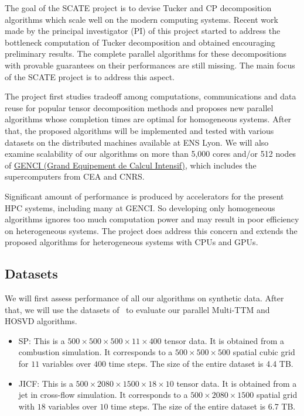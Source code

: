 \documentclass[a4paper,11pt]{article}
\newcommand{\sk}[1]{{\color{blue} \emph{#1}}}
\begin{document}
	The goal of the SCATE project is to devise Tucker and CP decomposition algorithms which scale well on the modern computing systems. Recent work~\cite{ABGKR-SIMAX-2024} made by the principal investigator (PI) of this project started to address the bottleneck computation of Tucker decomposition and obtained encouraging preliminary results. The complete parallel algorithms for these decompositions with provable guarantees on their performances are still missing. The main focus of the SCATE project is to address this aspect.
	
	The project first studies tradeoff among computations, communications and data reuse for popular tensor decomposition methods and proposes new parallel algorithms whose completion times are optimal for homogeneous systems. After that, the proposed algorithms will be implemented and tested with various datasets on the distributed machines available at ENS Lyon. We will also examine scalability of our algorithms on more than 5,000 cores and/or 512 nodes of \href{https://www.genci.fr/en/our-computers}{GENCI (Grand Equipement de Calcul Intensif)}, which includes the supercomputers from CEA and CNRS.

	
	
	Significant amount of performance is produced by accelerators for the present HPC systems, including many at GENCI. So developing only homogeneous algorithms ignores too much computation power and may result in poor efficiency on heterogeneous systems. The project does address this concern and extends the proposed algorithms for heterogeneous systems with CPUs and GPUs.
	
	

	

	\subsection{Datasets}
	\label{sec:context:datasets}
	We will first assess performance of all our algorithms on synthetic data. After that, we will use the datasets of~\cite{BKK-TOMS-2020} to evaluate our parallel Multi-TTM and HOSVD algorithms.
	\begin{itemize}
		\item SP: This is a $500 \times 500 \times 500 \times 11 \times 400$ tensor data. It is obtained from a combustion simulation. It corresponds to a $500 \times 500 \times 500$ spatial cubic grid for $11$ variables over $400$ time steps. The size of the entire dataset is 4.4 TB. 
		\item JICF: This is a $500 \times 2080 \times 1500 \times 18 \times 10$ tensor data. It is obtained from a jet in cross-flow simulation. It corresponds to a $500 \times 2080 \times 1500$ spatial grid with $18$ variables over $10$ time steps. The size of the entire dataset is 6.7 TB.
	\end{itemize}
	
\end{document}
